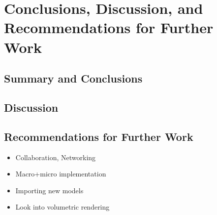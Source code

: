 \chapter[Conclusions]{Conclusions, Discussion, and Recommendations for Further Work}

\section{Summary and Conclusions}

\section{Discussion}
\section{Recommendations for Further Work}

\begin{itemize}
    \item Collaboration, Networking
    \item Macro+micro implementation
    \item Importing new models
    \item Look into volumetric rendering  
\end{itemize}
